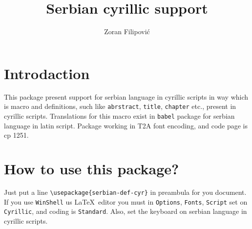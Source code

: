\documentclass[12pt]{article}
\title{Serbian cyrillic support}
\author{Zoran Filipovi\'{c}}
\begin{document}
\maketitle
{}


\section{Introdaction}

This package present support for serbian language in cyrillic scripts in 
way which is macro and definitions, such like \verb|abrstract|, \verb|title|, 
\verb|chapter| etc., present in cyrillic scripts. Translations for this macro 
exist in \verb|babel| package for serbian language in latin script. Package 
working in T2A font encoding, and code page is cp 1251.  

\section{How to use this package?}

Just put a  line \verb|\usepackage{serbian-def-cyr}| in preambula for 
you document. If you use \verb|WinShell| us \LaTeX\
editor you must in \verb|Options|, \verb|Fonts|, \verb|Script| set on
\verb|Cyrillic|, and coding is \verb|Standard|. Also, set the keyboard on
serbian language in cyrillic scripts. 
\end{document}

